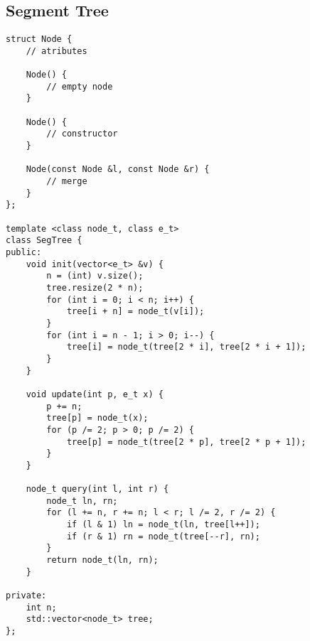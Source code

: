 \documentclass[12pt, a4paper, twoside]{article}
\begin{document}
\subsection{Segment Tree
}
\begin{lstlisting}
struct Node {
	// atributes

	Node() {
		// empty node
	}

	Node() {
		// constructor
	}
 
	Node(const Node &l, const Node &r) {
		// merge
	}
};

template <class node_t, class e_t>
class SegTree {
public:
	void init(vector<e_t> &v) {
		n = (int) v.size();
		tree.resize(2 * n);
		for (int i = 0; i < n; i++) {
			tree[i + n] = node_t(v[i]);
		}
		for (int i = n - 1; i > 0; i--) {
			tree[i] = node_t(tree[2 * i], tree[2 * i + 1]);
		}
	}

	void update(int p, e_t x) {
		p += n;
		tree[p] = node_t(x);
		for (p /= 2; p > 0; p /= 2) {
			tree[p] = node_t(tree[2 * p], tree[2 * p + 1]);
		}
	}

	node_t query(int l, int r) {
		node_t ln, rn;
		for (l += n, r += n; l < r; l /= 2, r /= 2) {
			if (l & 1) ln = node_t(ln, tree[l++]);
			if (r & 1) rn = node_t(tree[--r], rn);
		}
		return node_t(ln, rn);
	}

private:
	int n;
	std::vector<node_t> tree;
};
\end{lstlisting}
\end{document}
